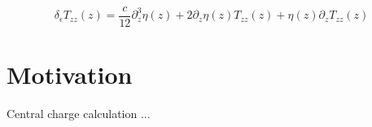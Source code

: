 \begin{equation}
    \label{eqn:central-charge-transformation-eqn}
    \delta_{\epsilon}T_{zz}(z) = \frac{c}{12}\partial^3_z\eta(z) + 2\partial_z\eta(z)T_{zz}(z) + \eta(z)\partial_zT_{zz}(z)
\end{equation}

\section{Motivation}

{\color{red} Central charge calculation ...}

%
%
